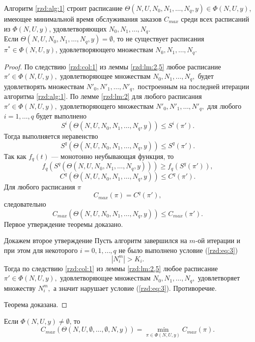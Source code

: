 \begin{theorem}\label{rzd:th:1}
 Алгоритм \ref{rzd:alg:1} строит расписание $\Theta(N,U,N_0, N_1, \dots, N_q, y) \in \Phi(N,U,y)$, имеющее минимальной время обслуживания заказов $C_{max}$ среди всех расписаний из $\Phi(N,U,y)$, удовлетворяющих $N_0, N_1, \dots, N_q$.\\
Если $\Theta(N,U,N_0, N_1, \dots, N_q, y) = \emptyset$, то не существует расписания $\pi^* \in \Phi(N,U,y)$, удовлетворяющего множествам $N_0, N_1, \dots, N_q$.
\end{theorem}

\begin{proof}
По следствию \ref{rzd:col:1} из леммы \ref{rzd:lm:2,5} любое расписание $\pi' \in \Phi(N,U,y),$ удовлетворяющее множествам $N_0, N_1, \dots, N_q,$ будет удовлетворять множествам $N'_0, N'_1, \dots, N'_q,$ построенным на последней итерации алгоритма \ref{rzd:alg:1}. По лемме \ref{rzd:lm:2} для любого расписания $\pi' \in \Phi(N,U,y),$ удовлетворяющего множествам $N'_0, N'_1, \dots, N'_q,$ для любого $i=1, \dots, q$ будет выполнено
$$S^i(\Theta(N,U,N_0, N_1, \dots, N_q, y)) \leq S^i(\pi').$$
Тогда выполняется неравенство
$$S^{q}(\Theta(N,U,N_0, N_1, \dots, N_q, y)) \leq S^{q}(\pi').$$
Так как $f_{q}(t)$ --- монотонно неубывающая функция, то
$$f_{q}(S^{q}(\Theta(N,U,N_0, N_1, \dots, N_q, y))) \geq f_{q}(S^{q}(\pi')),$$
$$C^{q}(\Theta(N,U,N_0, N_1, \dots, N_q, y)) \leq C^{q}(\pi').$$
Для любого расписания $\pi$
$$C_{max}(\pi) = C^{q}(\pi'),$$
следовательно
$$C_{max}(\Theta(N,U,N_0, N_1, \dots, N_q, y)) \leq C_{max}(\pi').$$
Первое утверждение теоремы доказано.

Докажем второе утверждение Пусть алгоритм завершился на $m$-ой итерации и при этом для некоторого $i = 0, 1, \dots, q$ не было выполнено условие (\ref{rzd:eq:3})
$$|N^m_i| > K_i.$$
Тогда по следствию \ref{rzd:col:1} из леммы \ref{rzd:lm:2,5} любое расписание $\pi' \in \Phi(N,U,y),$ удовлетворяющее множествам $N_0, N_1, \dots, N_q,$ удовлетворяет множеству $N^m_i,$ а значит нарушает условие (\ref{rzd:eq:3}). Противоречие.

Теорема доказана.
\end{proof}

\begin{corollary}\label{rzd:col:1,5}
Если $\Phi(N,U,y) \neq \emptyset$, то
$$C_{max}(\Theta(N,U,\emptyset, \dots,\emptyset, N,y)) = \min\limits_{\pi \in \Phi(N,U,y)} C_{max}(\pi).$$
\end{corollary}

